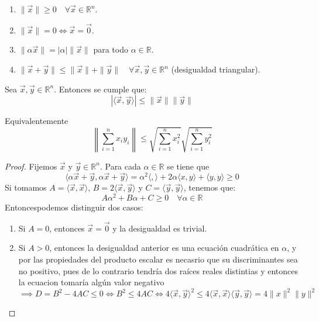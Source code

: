 \begin{proposición}
    \begin{enumerate}
        \item $\|\vec{x}\| \geq 0 \quad \forall \vec{x} \in \mathbb{R}^n$.
        \item $\|\vec{x}\| = 0 \Leftrightarrow \vec{x} = \vec{0}$.
        \item $\|\alpha \vec{x}\| = |\alpha| \|\vec{x}\|$ para todo $\alpha \in \mathbb{R}$.
        \item $\|\vec{x} + \vec{y}\| \leq \|\vec{x}\| + \|\vec{y}\| \quad \forall \vec{x}, \vec{y} \in \mathbb{R}^n$ (desigualdad triangular).
    \end{enumerate}
\end{proposición}

\begin{teorema}
    Sea \( \vec{x}, \vec{y} \in \mathbb{R}^n \). Entonces se cumple que:
    \[
        |\langle \vec{x}, \vec{y} \rangle| \leq \|\vec{x}\| \|\vec{y}\|
    \]

    Equivalentemente 
    $$\left\|\sum_{i=1}^{n} x_i y_i\right\| \leq \sqrt{\sum_{i=1}^{n} x_i^2} \sqrt{\sum_{i=1}^{n} y_i^2}$$
    
\end{teorema}

\begin{proof}
    Fijemos $\vec{x}$ y $\vec{y} \in \mathbb{R}^n$. Para cada $\alpha \in \mathbb{R}$ se tiene que 
    $$\langle \alpha \vec{x} + \vec{y}, \alpha \vec{x} + \vec{y} \rangle  = \alpha^2 \langle , \rangle + 2\alpha \langle x, y\rangle + \langle y, y \rangle \geq 0$$
    Si tomamos $A = \langle \vec{x}, \vec{x} \rangle$, $B = 2\langle \vec{x}, \vec{y} \rangle$ y $C = \langle \vec{y}, \vec{y} \rangle$, tenemos que: 
    $$A\alpha^2 + B\alpha + C \geq 0 \quad \forall \alpha \in \mathbb{R}$$
    Entoncespodemos distinguir dos casos:
    \begin{enumerate}
        \item Si \( A = 0 \), entonces \( \vec{x} = \vec{0} \) y la desigualdad es trivial.
        \item Si \( A > 0 \), entonces la desigualdad anterior es una ecuación cuadrática en \( \alpha \), y por las propiedades del producto escalar es necasrio que su discriminantes sea no positivo, pues de lo contrario tendría dos raíces reales distintias y entonces la ecuacion tomaría algún valor negativo 
        $$\implies D = B^2 - 4AC \leq 0 \iff B^2 \leq 4AC \iff 4\langle \vec{x}, \vec{y} \rangle^2 \leq 4\langle \vec{x}, \vec{x} \rangle \langle \vec{y}, \vec{y} \rangle = 4\|x\|^2 \|y\|^2$$
    \end{enumerate}

\end{proof}

